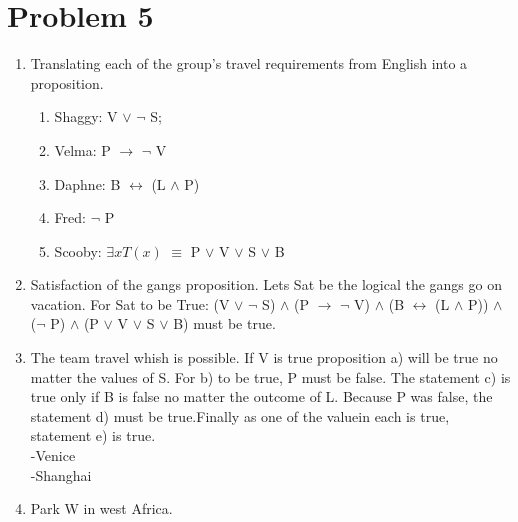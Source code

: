 \documentclass[12pt,letterpaper]{article}
\begin{document}
\section*{Problem 5}
\begin{enumerate}
  \item Translating each of the group’s travel requirements from English into a proposition.
  \begin{enumerate}
    \item Shaggy: V \({\lor}\) \({\neg}\) S;
    \item Velma: P \({\rightarrow}\) \({\neg}\) V
    \item Daphne: B \({\leftrightarrow}\) (L \({\land}\) P)
    \item Fred: \({\neg}\) P
    \item Scooby: \({\exists}xT(x)\) \({\equiv}\) P \({\lor}\) V \({\lor}\) S \({\lor}\) B
  \end{enumerate}
  \item Satisfaction of the gangs proposition. Lets Sat be the logical the gangs go on vacation. For Sat to be True:
  (V \({\lor}\) \({\neg}\) S)  \({\land}\) (P \({\rightarrow}\) \({\neg}\) V) \({\land}\) (B \({\leftrightarrow}\) (L \({\land}\) P)) \({\land}\) (\({\neg}\) P) \({\land}\)
(P \({\lor}\) V \({\lor}\) S \({\lor}\) B) must be true.
  \item The team travel whish is possible. If V is true proposition a) will be true no 
  matter the values of S. For b) to be true, P must be false. The statement
  c) is true only if B is false no matter the outcome of L. Because P was false, the statement d) must be true.Finally as one of the valuein each
  is true, statement e) is true.\\
  -Venice\\
  -Shanghai\\
  \item Park W in west Africa.
\end{enumerate}
\end{document}
